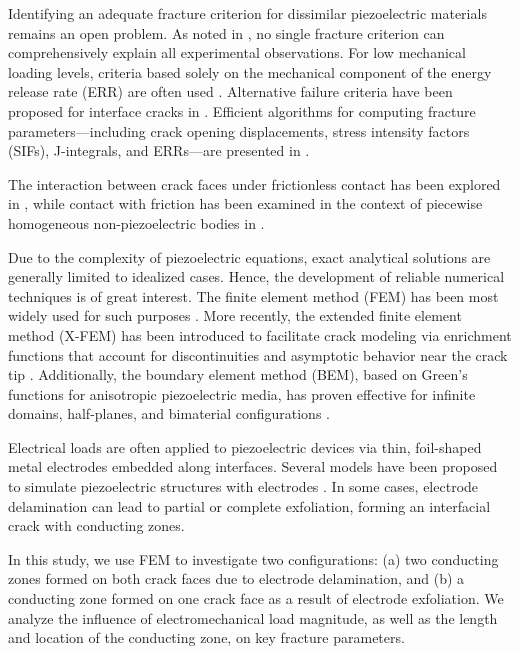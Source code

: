 Identifying an adequate fracture criterion for dissimilar piezoelectric materials remains an open problem. As noted in \cite{Adlucky8}, no single fracture criterion can comprehensively explain all experimental observations. For low mechanical loading levels, criteria based solely on the mechanical component of the energy release rate (ERR) are often used \cite{Adlucky55,Adlucky56}. Alternative failure criteria have been proposed for interface cracks in \cite{Adlucky26,Adlucky71}. Efficient algorithms for computing fracture parameters—including crack opening displacements, stress intensity factors (SIFs), J-integrals, and ERRs—are presented in \cite{Adlucky7,Adlucky14,Adlucky32,Adlucky33,Adlucky34,Adlucky45}.

The interaction between crack faces under frictionless contact has been explored in \cite{Adlucky22,Adlucky42,Adlucky47}, while contact with friction has been examined in the context of piecewise homogeneous non-piezoelectric bodies in \cite{Adlucky27}.

Due to the complexity of piezoelectric equations, exact analytical solutions are generally limited to idealized cases. Hence, the development of reliable numerical techniques is of great interest. The finite element method (FEM) \cite{Adlucky72} has been most widely used for such purposes \cite{Adlucky19,Adlucky28,Adlucky29,Adlucky30,Adlucky31}. More recently, the extended finite element method (X-FEM) has been introduced to facilitate crack modeling via enrichment functions that account for discontinuities and asymptotic behavior near the crack tip \cite{Adlucky4,Adlucky44}. Additionally, the boundary element method (BEM), based on Green’s functions for anisotropic piezoelectric media, has proven effective for infinite domains, half-planes, and bimaterial configurations \cite{Adlucky9,Adlucky10,Adlucky37,Adlucky54}.

Electrical loads are often applied to piezoelectric devices via thin, foil-shaped metal electrodes embedded along interfaces. Several models have been proposed to simulate piezoelectric structures with electrodes \cite{Adlucky11,Adlucky17,Adlucky39,Adlucky41,Adlucky58,Adlucky59}. In some cases, electrode delamination can lead to partial or complete exfoliation, forming an interfacial crack with conducting zones.

In this study, we use FEM to investigate two configurations: (a) two conducting zones formed on both crack faces due to electrode delamination, and (b) a conducting zone formed on one crack face as a result of electrode exfoliation. We analyze the influence of electromechanical load magnitude, as well as the length and location of the conducting zone, on key fracture parameters.

